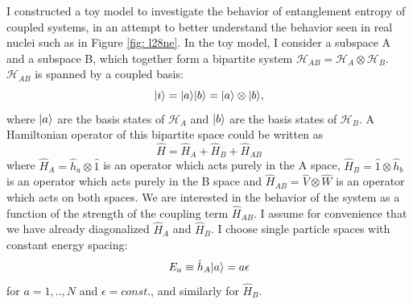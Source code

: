 I constructed a toy model to investigate the behavior of 
entanglement entropy of coupled systems, in an attempt 
to better understand the behavior seen in real nuclei such as in Figure 
\ref{fig: l28ne}. In the toy model, I consider a subspace A and a subspace B, 
which together form a 
bipartite system $\mathcal{H}_{AB}=\mathcal{H}_A\otimes\mathcal{H}_B$.
$\mathcal{H}_{AB}$ is spanned by a coupled basis:
\begin{equation}
    |i\rangle = |a\rangle|b\rangle = |a\rangle\otimes |b\rangle,
\end{equation}
where $|a\rangle$ are the basis states of $\mathcal{H}_A$ and 
$|b\rangle$ are the basis states of $\mathcal{H}_B$. A Hamiltonian operator of this
bipartite space could be written as
\begin{equation}
    \hat{H} = \hat{H}_A + \hat{H}_B + \hat{H}_{AB} 
\end{equation}
where $\hat{H}_A =\hat{h}_a \otimes \hat{1}$ is an operator which acts purely in the A space,
$\hat{H}_B=\hat{1}\otimes\hat{h}_b$ is an operator which acts purely in the B space and
$\hat{H}_{AB}=\hat{V}\otimes\hat{W}$ is an operator which acts on both spaces. 
We are interested in the behavior of the system as a function of the strength of the
coupling term $\hat{H}_{AB}$. I assume for convenience that we have already diagonalized $\hat{H}_A$
and $\hat{H}_B$. I choose single particle spaces with constant energy
spacing:
\begin{equation}
	E_a \equiv \hat{h}_A |a\rangle = a \epsilon 
\end{equation}
for $a=1,..,N$ and $\epsilon = const.$, and similarly for $\hat{H}_B$.

